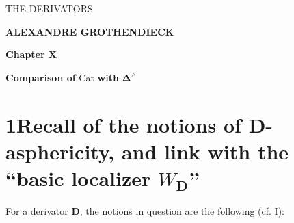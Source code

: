 \documentclass[11pt]{article}
\newcommand{\printedpage}[1]{\marginpar{\footnotesize p.~#1}}
\newcommand{\msp}[1]{\marginpar{\footnotesize [#1]}}
\newcommand{\D}{\mathbf{D}}
\newcommand{\bDelta}{\boldsymbol{\Delta}}
\begin{document}
\printedpage{}

\begin{center}
{\LARGE \textsf{THE DERIVATORS}}

\bigskip

{\large \textbf{ALEXANDRE GROTHENDIECK}}

\vspace{3em}

{\large \textbf{Chapter X}}

\medskip

{\large \textbf{Comparison of} Cat \textbf{with} $\bDelta^{\wedge}$}
\end{center}

\clearpage


\printedpage{1}

\msp{page 1}

\section*{1\quad Recall of the notions of D-asphericity, and link with the ``basic localizer $W_{\mathbf{D}}$''}

For a derivator $\D$, the notions in question are the following (cf. I):
\end{document}
